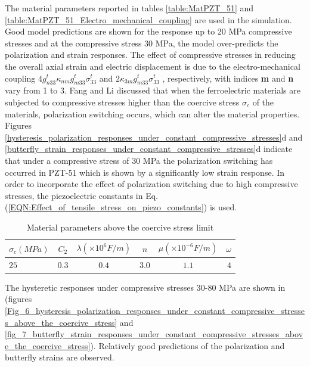 The material parameters reported in tables \ref{table:MatPZT_51} and \ref{table:MatPZT_51_Electro_mechanical_coupling} are used in the simulation. 
Good model predictions are shown for the response up to 20 MPa compressive stresses and at the compressive stress 30 MPa,
 the model over-predicts the polarization and strain responses. 
 The effect of compressive stresses in reducing the overall axial strain and
 electric displacement is due to the electro-mechanical coupling $4g_{n33}^t{\kappa _{nm}}g_{m33}^t\sigma _{33}^t$ and $2{\kappa _{3m}}g_{m33}^t\sigma _{33}^t$ , respectively, with indices \textbf{m} and \textbf{n} vary from 1 to 3. Fang and Li \cite{Li2004959} discussed that when the ferroelectric materials are subjected to compressive stresses higher than the coercive stress $\sigma _c$ of the materials, polarization switching occurs, which can alter the material properties.
 Figures \ref{hysteresis_polarization_responses_under_constant_compressive_stresses}d and \ref{butterfly_strain_responses_under_constant_compressive_stresses}d indicate that under a compressive stress of 30 MPa the polarization switching has occurred in PZT-51 which is shown by a significantly low strain response.
In order to incorporate the effect of polarization switching due to high compressive stresses, the piezoelectric constants in Eq. (\ref{EQN:Effect_of_tensile_stress_on_piezo_constants}) is used. 
\begin{table}
\caption{Material parameters above the coercive stress limit}
\centering
\begin{tabular}{l c c c c r}
\hline
$\sigma_c (MPa)$ & $C_2$ & $\lambda (\times 10 ^6 F/m)$ & $n$ & $ \mu (\times 10^{-6} F/m) $ & $\omega$ \\ \hline
$25$ & $0.3$ & $0.4$ & $3.0$ & $1.1$ & $4$ \\ \hline
\end{tabular} 
\label{table4:Material_parameters_above_the_coercive_stress_limit}
\end{table}
The hysteretic responses under compressive stresses 30-80 MPa are shown in (figures \ref{Fig_6_hysteresis_polarization_responses_under_constant_compressive_stresses_above_the_coercive_stress} and \ref{fig_7_butterfly_strain_responses_under_constant_compressive_stresses_above_the_coercive_stress}). 
Relatively good predictions of the polarization and butterfly strains are observed.
